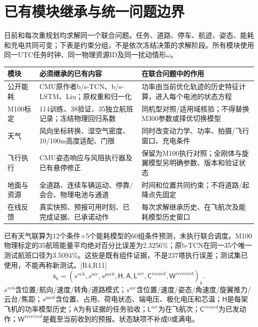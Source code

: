 \section{已有模块继承与统一问题边界}
\noindent 日前和每次重规划均求解同一个联合问题。任务、道路、停车、航迹、姿态、能耗和充电共同可变；下表是约束分组，不是依次冻结决策的求解阶段。所有模块使用同一UTC任务时钟、同一物理资源ID及同一扰动情形$\omega$。
\begin{center}\small
\begin{tabular}{p{.19\linewidth}p{.35\linewidth}p{.36\linewidth}}\toprule
模块 & 必须继承的已有内容 & 在联合问题中的作用\\\midrule
公开能耗 & CMU原作者b/s-TCN、b/s-LSTM、Liu；原权重和归一化 & 功率由当前优化轨迹的历史特征计算，进入每个电池的状态方程\\
M100标定 & 114训练、38验证、35独立航班记录；冻结物理回归系数 & 同机型对照/适用域核验；不得替换M300参数或择优切换模型\\
天气 & 风向坐标转换、湿空气密度、10/100m高度适配、门限 & 同时改变动力学、功率、拍摄/飞行窗口、充电条件\\
飞行执行 & CMU姿态响应与风阻执行器及已有悬停修正 & 保留为M100执行对照；全刚体与旋翼模型另明确参数、版本和验证状态\\
地面与资源 & 全道路、连续车辆运动、停靠/会合、物理电池与通道 & 时间和位置共同约束；不将道路/起降点先固定\\
在线反馈 & 真实快照、预报可用时刻、已完成证据、已承诺动作 & 每次求解继承历史、在飞航次及能耗模型历史窗口\\\bottomrule
\end{tabular}\end{center}
\noindent 已有天气联算为12个条件$\times$5个能耗模型的60组条件预测，未执行联合调度。M100物理标定的35航班能量平均绝对百分比误差为2.3256\%；原b-TCN在同一35个唯一测试航班口径为3.5094\%。这些是既有组件证据，不是237塔执行误差；测试集已使用，不能再称新测试。[R4,R11]
\begin{equation}
 \mathsf s_k=(s^{veh},s^{air},s^{pack},\mathsf H,\mathsf A,\mathsf L^{air},
              \mathsf C^{issued},\mathsf W^{received})_k.
 \label{eng:eq:jointstate}
\end{equation}
\noindent $s^{veh}$含位置/航向/速度/转角/道路模式；$s^{air}$含位置/速度/姿态/角速度/旋翼推力/云台/焦距；$s^{pack}$含位置、占用、荷电状态、端电压、极化电压和芯温；$\mathsf H$是每架飞机的功率模型历史；$\mathsf A$为有证据的任务验收；$\mathsf L^{air}$为在飞航次；$\mathsf C^{issued}$为已发动作；$\mathsf W^{received}$是截至当前收到的预报。状态缺项不补成0或满电。
